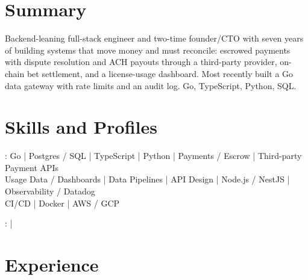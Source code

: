 \documentclass[print]{jack-resume}
\begin{document}
\pagecolor{darkmodeBackground}


\begin{minipage}[t][1cm][t]{.03\textwidth}
    \hfill
\end{minipage}

\section{Summary}
Backend-leaning full-stack engineer and two-time founder/CTO with seven years of building systems that move money and must reconcile: escrowed payments with dispute resolution and ACH payouts through a third-party provider, on-chain bet settlement, and a license-usage dashboard. Most recently built a Go data gateway with rate limits and an audit log. Go, TypeScript, Python, SQL.
\sectionsep

\section{Skills and Profiles}
:
Go \hfill | \hfill
Postgres / SQL \hfill | \hfill
TypeScript \hfill | \hfill
Python \hfill | \hfill
Payments / Escrow \hfill | \hfill
Third-party Payment APIs \\
\hspace{1.0cm} Usage Data / Dashboards \hfill | \hfill
Data Pipelines \hfill | \hfill
API Design \hfill | \hfill
Node.js / NestJS \hfill | \hfill
Observability / Datadog \\
\hspace{1.0cm} CI/CD \hfill | \hfill
Docker \hfill | \hfill
AWS / GCP \\

\raggedright{
    :
      \href{https://www.linkedin.com/in/jack-sturtevant/}{ \ExternalLink} |
     \href{https://github.com/jacksturt}{ \ExternalLink}}

\section{Experience}
\end{document}
